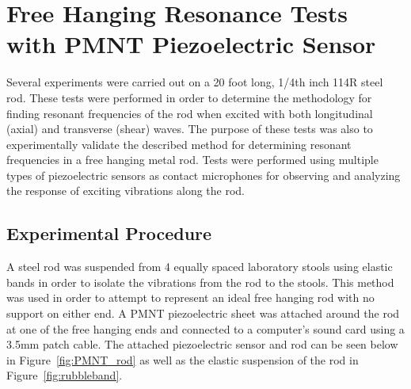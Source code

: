 
\section{Free Hanging Resonance Tests with PMNT Piezoelectric Sensor}

Several experiments were carried out on a 20 foot long, 1/4th inch 114R steel rod. These tests were performed in order to determine the methodology for finding resonant frequencies of the rod when excited with both longitudinal (axial) and transverse (shear) waves. The purpose of these tests was also to experimentally validate the described method for determining resonant frequencies in a free hanging metal rod. Tests were performed using multiple types of piezoelectric sensors as contact microphones for observing and analyzing the response of exciting vibrations along the rod. 

\subsection{Experimental Procedure}

A steel rod was suspended from 4 equally spaced laboratory stools using elastic bands in order to isolate the vibrations from the rod to the stools. This method was used in order to attempt to represent an ideal free hanging rod with no support on either end. A PMNT piezoelectric sheet was attached around the rod at one of the free hanging ends and connected to a computer’s sound card using a 3.5mm patch cable. The attached piezoelectric sensor and rod can be seen below in Figure~\ref{fig:PMNT_rod} as well as the elastic suspension of the rod in Figure~\ref{fig:rubbleband}.

